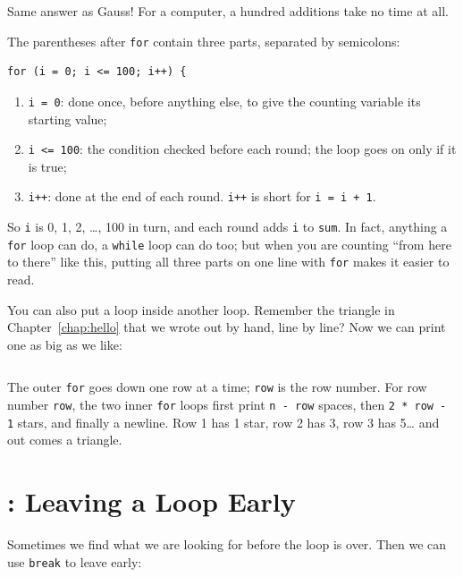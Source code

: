 Same answer as Gauss! For a computer, a hundred additions take no time at all.

The parentheses after \texttt{for} contain three parts, separated by semicolons:
\begin{verbatim}
for (i = 0; i <= 100; i++) {
\end{verbatim}
\begin{enumerate}
  \item \texttt{i = 0}: done once, before anything else, to give the counting variable its starting value;
  \item \texttt{i <= 100}: the condition checked before each round; the loop goes on only if it is true;
  \item \texttt{i++}: done at the end of each round. \texttt{i++} is short for \texttt{i = i + 1}.
\end{enumerate}
So \texttt{i} is 0, 1, 2, \ldots{}, 100 in turn, and each round adds \texttt{i} to \texttt{sum}. In fact, anything a \texttt{for} loop can do, a \texttt{while} loop can do too; but when you are counting ``from here to there'' like this, putting all three parts on one line with \texttt{for} makes it easier to read.

You can also put a loop inside another loop. Remember the triangle in Chapter~\ref{chap:hello} that we wrote out by hand, line by line? Now we can print one as big as we like:


\inputminted[linenos=false]{text}{code/en/ch02/out/triangle.txt}

The outer \texttt{for} goes down one row at a time; \texttt{row} is the row number. For row number \texttt{row}, the two inner \texttt{for} loops first print \texttt{n - row} spaces, then \texttt{2 * row - 1} stars, and finally a newline. Row 1 has 1 star, row 2 has 3, row 3 has 5\ldots{} and out comes a triangle.

\section{\texorpdfstring{}{break}: Leaving a Loop Early}
\label{sec:break}

Sometimes we find what we are looking for before the loop is over. Then we can use \texttt{break} to leave early:


